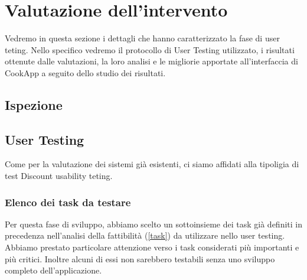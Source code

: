 \section{Valutazione dell'intervento}
Vedremo in questa sezione i dettagli che hanno caratterizzato la fase di user teting. 
Nello specifico vedremo il protocollo di User Testing utilizzato, i
risultati ottenute dalle valutazioni, la loro analisi e le migliorie
apportate all'interfaccia di CookApp a seguito dello studio dei
risultati.

\subsection{Ispezione}

\subsection{User Testing}

Come per la valutazione dei sistemi già esistenti, ci siamo affidati
alla tipoligia di test Discount usability teting.

\subsubsection*{Elenco dei task da testare}
Per questa fase di sviluppo, abbiamo scelto un sottoinsieme dei task già definiti in precedenza
nell'analisi della fattibilità (\ref{task}) da utilizzare nello user
testing. Abbiamo prestato particolare attenzione verso i task
considerati più importanti e più critici. Inoltre alcuni di essi non
sarebbero testabili senza uno sviluppo completo dell'applicazione.

